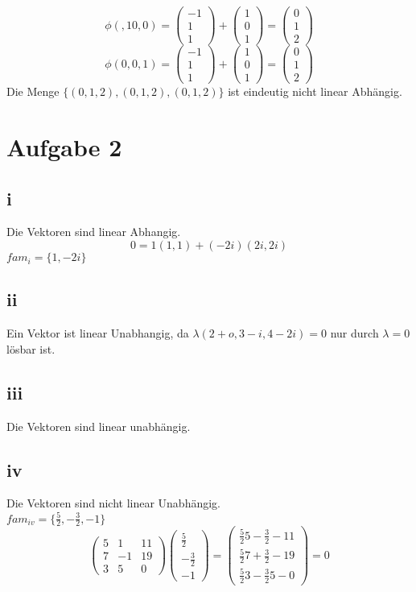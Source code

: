 \documentclass[10pt,a4paper]{article}
\begin{document}
$$ 
\phi(,10,0) = 
\begin{pmatrix}-1\\1\\1 \end{pmatrix}+
\begin{pmatrix}1\\0\\1 \end{pmatrix} =
\begin{pmatrix} 0\\1\\2 \end{pmatrix}
$$$$ 
\phi(0,0,1) = 
\begin{pmatrix}-1\\1\\1 \end{pmatrix}+
\begin{pmatrix}1\\0\\1 \end{pmatrix} =
\begin{pmatrix} 0\\1\\2 \end{pmatrix}
$$
Die Menge $\{(0,1,2),(0,1,2),(0,1,2)\}$ ist eindeutig nicht linear Abhängig.

\section{Aufgabe 2}
\subsection{i}
Die Vektoren sind linear Abhangig. \\
$$ 0 = 1(1,1)+(-2i)(2i,2i)$$
$fam_i = \{1,-2i\}$
\subsection{ii}
Ein Vektor ist linear Unabhangig, da $\lambda(2+o,3-i,4-2i)=0$ nur durch $\lambda = 0$ lösbar ist. 
\subsection{iii}
Die Vektoren sind linear unabhängig.
\subsection{iv}
Die Vektoren sind nicht linear Unabhängig.\\
$fam_{iv}=\{\frac{5}{2},-\frac{3}{2},-1 \}$
$$\begin{pmatrix}
5&1&11\\7&-1&19\\3&5&0
\end{pmatrix}\begin{pmatrix}
\frac{5}{2}\\-\frac{3}{2} \\ -1
\end{pmatrix} =
\begin{pmatrix}
\frac{5}{2}5-\frac{3}{2}-11\\\frac{5}{2}7+\frac{3}{2}-19\\\frac{5}{2}3-\frac{3}{2}5-0
\end{pmatrix} = 0$$
\end{document}

